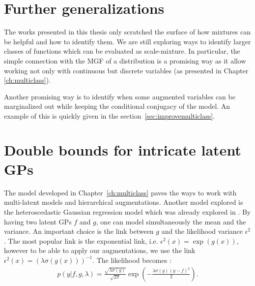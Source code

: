 

\graphicspath{{8/figures/}}


\section{Further generalizations}
The works presented in this thesis only scratched the surface of how mixtures can be helpful and how to identify them.
We are still exploring ways to identify larger classes of functions which can be evaluated as scale-mixture.
In particular, the simple connection with the \acf{MGF} of a distribution is a promising way as it allow working not only with continuous but discrete variables (as presented in Chapter \ref{ch:multiclass}).

Another promising way is to identify when some augmented variables can be marginalized out while keeping the conditional conjugacy of the model.
An example of this is quickly given in the section~\ref{sec:improvemulticlass}.

\section{Double bounds for intricate latent GPs}

The model developed in Chapter~\ref{ch:multiclass} paves the ways to work with multi-latent models and hierarchical augmentations.
Another model explored is the heteroscedastic Gaussian regression model which was already explored in \cite{} \needcite.
By having two latent \ac{GPs} $f$ and $g$, one can model simultaneously the mean and the variance.
An important choice is the link between $g$ and the likelihood variance $\epsilon^2$.
The most popular link is the exponential link, i.e. $\epsilon^2(x) = \exp(g(x))$, however to be able to apply our augmentations, we use the link $\epsilon^2(x) = \left(\lambda \sigma(g(x))\right)^{-1}$.
The likelihood becomes :
\begin{align}
    p(y|f,g,\lambda) = \frac{\sqrt{\lambda \sigma(g)}}{\sqrt{2\pi}}\exp\left(-\frac{\lambda \sigma(g)(y-f)^2}{2}\right).\label{eq:hetero_lik}
\end{align}

